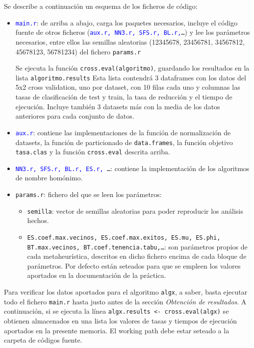\documentclass[a4paper,11pt]{article}
\newcommand{\blue}[1]{\textcolor{blue}{#1}}
\begin{document}
Se describe a continuación un esquema de los ficheros de código:
\begin{itemize}
 \item \texttt{\blue{main.r}}: de arriba a abajo, carga los paquetes necesarios, incluye el código fuente de otros ficheros
  (\texttt{\blue{aux.r, NN3.r, SFS.r, BL.r,}\ldots}) y lee los parámetros necesarios, entre ellos las semillas aleatorias
  (12345678, 23456781, 34567812, 45678123, 56781234) del fichero \texttt{params.r}
  
  Se ejecuta la función \texttt{cross.eval(algoritmo)}, guardando los resultados en la lista \texttt{algoritmo.results}
  Esta lista contendrá 3 dataframes con los datos del 5x2 cross validation, uno por dataset, con 10 filas cada uno 
  y columnas las tasas de clasificación de test y train, la tasa de reducción y el tiempo de ejecución. 
  Incluye también 3 datasets más con la media de los datos anteriores para cada conjunto de datos.
 
 \item \texttt{\blue{aux.r}}: contiene las implementaciones de la función de normalización de datasets, la función de
 particionado de \texttt{data.frames}, la función objetivo \texttt{tasa.clas} y la función \texttt{cross.eval}
 descrita arriba.
 
 \item \texttt{\blue{NN3.r, SFS.r, BL.r, ES.r, }\ldots}: contiene la implementación de los algoritmos de nombre 
 homónimo.
 
 \item \texttt{params.r}: fichero del que se leen los parámetros:
  \begin{itemize}
    \item \texttt{semilla}: vector de semillas aleatorias para poder reproducir los análisis hechos.
    \item \texttt{ES.coef.max.vecinos, ES.coef.max.exitos, ES.mu, ES.phi, \\BT.max.vecinos, BT.coef.tenencia.tabu,\ldots}:
    son parámetros propios de cada metaheurística, descritos en dicho fichero encima de cada bloque de parámetros.
    Por defecto están seteados para que se empleen los valores aportados en la documentación de la práctica.
  \end{itemize}
 \end{itemize}
 
 Para verificar los datos aportados para el algoritmo \texttt{algx}, a saber, basta ejecutar todo el fichero \texttt{main.r}
 hasta justo antes de la sección \textit{Obtención de resultados}. A continuación, si se ejecuta la línea 
 \texttt{algx.results <- cross.eval(algx)} se obtienen almacenados en una lista los valores de tasas y tiempos de ejecución
 aportados en la presente memoria. El working path debe estar seteado a la carpeta de códigos fuente.
 
\end{document}
